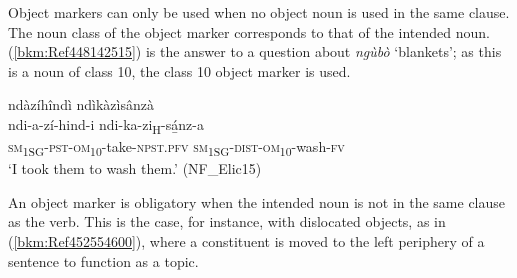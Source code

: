 \begin{table}
\label{bkm:Ref505870543}\caption{\label{tab:7:2}Object markers}
\end{table}

Object markers can only be used when no object noun is used in the same clause. The noun class of the object marker corresponds to that of the intended noun. (\ref{bkm:Ref448142515}) is the answer to a question about \textit{ngùbò} ‘blankets’; as this is a noun of class 10, the class 10 object marker is used.

\ea
\label{bkm:Ref448142515}
ndàzíhîndì ndìkàzìsânzà\\
\gll ndi-a-zí-hind-i      ndi-ka-zi\textsubscript{H}-sá̲nz-a\\
\textsc{sm}\textsubscript{1SG}-\textsc{pst}-\textsc{om}\textsubscript{10}-take-\textsc{npst}.\textsc{pfv}  \textsc{sm}\textsubscript{1SG}-\textsc{dist}-\textsc{om}\textsubscript{10}-wash-\textsc{fv}\\
\glt ‘I took them to wash them.’ (NF\_Elic15)
\z

An object marker is obligatory when the intended noun is not in the same clause as the verb. This is the case, for instance, with dislocated objects, as in (\ref{bkm:Ref452554600}), where a constituent is moved to the left periphery of a sentence to function as a topic.


